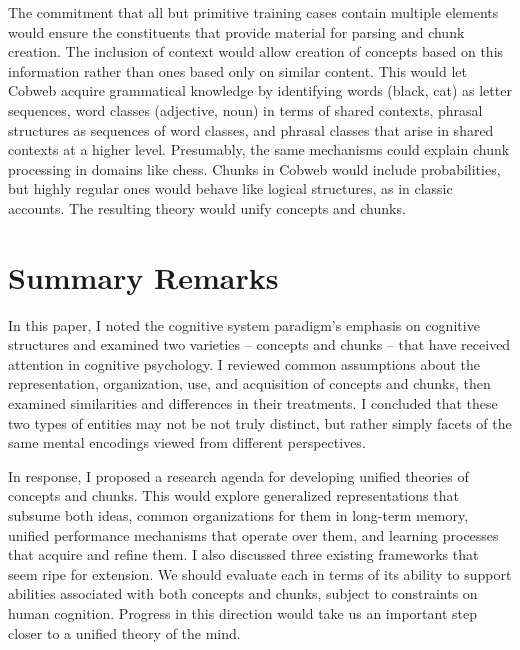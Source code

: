 \documentclass[11pt,letterpaper]{article}
\begin{document}

The commitment that all but primitive training cases contain multiple
elements would ensure the constituents that provide material for 
parsing and chunk creation. The inclusion of context would allow 
creation of concepts based on this information rather than ones based
only on similar content. This would let Cobweb acquire grammatical
knowledge by identifying words (black, cat) as letter
sequences, word classes (adjective, noun) in terms of shared contexts,
phrasal structures as sequences of word classes, and phrasal classes
that arise in shared contexts at a higher level. Presumably, the same
mechanisms could explain chunk processing in domains like chess.
Chunks in Cobweb would include probabilities, but highly regular
ones would behave like logical structures, as in classic accounts.
The resulting theory would unify concepts and chunks. 


\section{Summary Remarks}

In this paper, I noted the cognitive system paradigm's emphasis
on cognitive structures and examined two varieties -- concepts and
chunks -- that have received attention in cognitive psychology.
I reviewed common assumptions about the representation, organization,
use, and acquisition of concepts and chunks, then examined similarities
and differences in their treatments. I concluded that these two types 
of entities may not be not truly distinct, but rather simply facets 
of the same mental encodings viewed from different perspectives. 

In response, I proposed a research agenda for developing unified 
theories of concepts and chunks. This would explore generalized 
representations that subsume both ideas, common organizations 
for them in long-term memory, unified performance mechanisms that 
operate over them, and learning processes that acquire and refine 
them. I also discussed three existing frameworks that seem ripe
for extension. We should evaluate each in terms of its ability to
support abilities associated with both concepts and chunks, subject 
to constraints on human cognition. Progress in this direction would
take us an important step closer to a unified theory of the mind.
\end{document}
